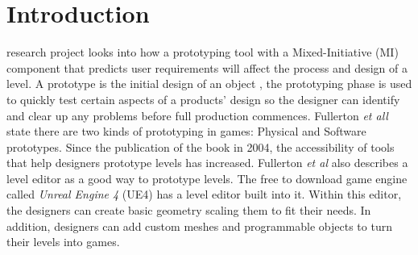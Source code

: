 \documentclass[journal]{IEEEtran}
\begin{document}
\section{Introduction} \label{intro}
 research project looks into how a prototyping tool with a Mixed-Initiative (MI) component that predicts user requirements will affect the process and design of a level. A prototype is the initial design of an object \cite{prototype}, the prototyping phase is used to quickly test certain aspects of a products' design so the designer can identify and clear up any problems before full production commences\cite{budde1992prototyping}. Fullerton \textit{et all} \cite[p.~150]{fullerton2004game} state there are two kinds of prototyping in games: Physical and Software prototypes. Since the publication of the book in 2004, the accessibility of tools that help designers prototype levels has increased. Fullerton \textit{et al} \cite[p.~164]{fullerton2004game} also describes a level editor as a good way to prototype levels. The free to download game engine called \textit{Unreal Engine 4} (UE4) has a level editor built into it. Within this editor, the designers can create basic geometry scaling them to fit their needs. In addition, designers can add custom meshes and programmable objects to turn their levels into games.
\end{document}
